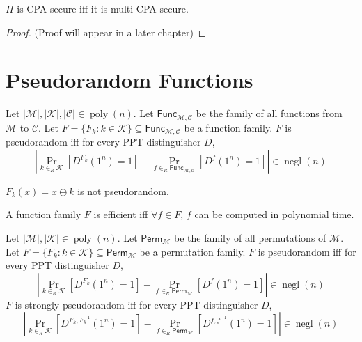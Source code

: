 \begin{theorem} $\Pi$ is CPA-secure iff it is multi-CPA-secure. \end{theorem}
\begin{proof} (Proof will appear in a later chapter) \end{proof}

\section{Pseudorandom Functions}

\begin{definition}
Let $|\mathcal{M}|, |\mathcal{K}|, |\mathcal{C}| \in \operatorname{poly}(n)$.
Let $\mathsf{Func}_{\mathcal{M}, \mathcal{C}}$ be the family of all functions from $\mathcal{M}$ to $\mathcal{C}$.
Let $F = \{F_k: k \in \mathcal{K} \} \subseteq \mathsf{Func}_{\mathcal{M}, \mathcal{C}}$ be a function family.
$F$ is pseudorandom iff for every PPT distinguisher $D$,
\[ \left| \Pr_{k \in_R \mathcal{K}}\left[ D^{F_k}(1^n) = 1 \right]
- \Pr_{f \in_R \mathsf{Func}_{\mathcal{M}, \mathcal{C}}}\left[ D^f(1^n) = 1 \right] \right|
\in \operatorname{negl}(n) \]
\end{definition}

\begin{example} $F_k(x) = x \oplus k$ is not pseudorandom. \end{example}

\begin{definition} A function family $F$ is efficient iff $\forall f \in F$,
$f$ can be computed in polynomial time. \end{definition}

\begin{definition}
Let $|\mathcal{M}|, |\mathcal{K}| \in \operatorname{poly}(n)$.
Let $\mathsf{Perm}_{\mathcal{M}}$ be the family of all permutations of $\mathcal{M}$.
Let $F = \{F_k: k \in \mathcal{K} \} \subseteq \mathsf{Perm}_{\mathcal{M}}$ be a permutation family.
$F$ is pseudorandom iff for every PPT distinguisher $D$,
\[ \left| \Pr_{k \in_R \mathcal{K}}\left[ D^{F_k}(1^n) = 1 \right]
- \Pr_{f \in_R \mathsf{Perm}_{\mathcal{M}}}\left[ D^f(1^n) = 1 \right] \right|
\in \operatorname{negl}(n) \]
$F$ is strongly pseudorandom iff for every PPT distinguisher $D$,
\[ \left| \Pr_{k \in_R \mathcal{K}}\left[ D^{F_k,F_k^{-1}}(1^n) = 1 \right]
- \Pr_{f \in_R \mathsf{Perm}_{\mathcal{M}}}\left[ D^{f,f^{-1}}(1^n) = 1 \right] \right|
\in \operatorname{negl}(n) \]
\end{definition}


